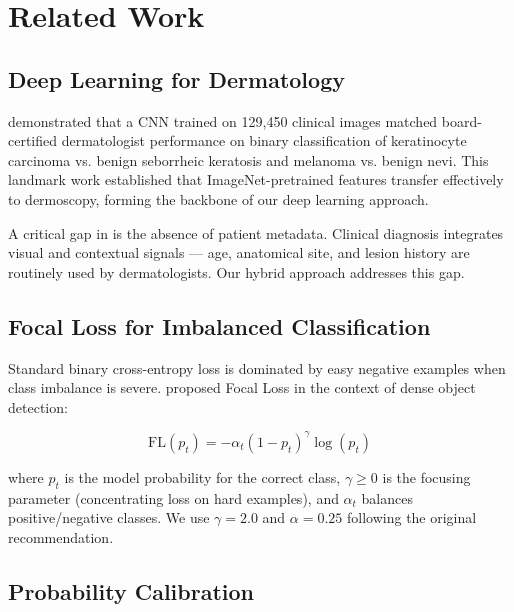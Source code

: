 \documentclass[12pt, a4paper]{article}
\begin{document}
\section{Related Work}
\label{sec:related}

\subsection{Deep Learning for Dermatology}

\citet{esteva2017dermatologist} demonstrated that a CNN trained on 129,450 clinical
images matched board-certified dermatologist performance on binary classification of
keratinocyte carcinoma vs. benign seborrheic keratosis and melanoma vs. benign nevi.
This landmark work established that ImageNet-pretrained features transfer effectively
to dermoscopy, forming the backbone of our deep learning approach.

A critical gap in \citet{esteva2017dermatologist} is the absence of patient metadata.
Clinical diagnosis integrates visual and contextual signals — age, anatomical site,
and lesion history are routinely used by dermatologists. Our hybrid approach addresses
this gap.

\subsection{Focal Loss for Imbalanced Classification}

Standard binary cross-entropy loss is dominated by easy negative examples when
class imbalance is severe. \citet{lin2017focal} proposed Focal Loss in the context
of dense object detection:

\begin{equation}
    \text{FL}(p_t) = -\alpha_t (1 - p_t)^\gamma \log(p_t)
    \label{eq:focal_loss}
\end{equation}

where $p_t$ is the model probability for the correct class, $\gamma \geq 0$
is the focusing parameter (concentrating loss on hard examples), and $\alpha_t$
balances positive/negative classes. We use $\gamma = 2.0$ and $\alpha = 0.25$
following the original recommendation.

\subsection{Probability Calibration}
\end{document}
